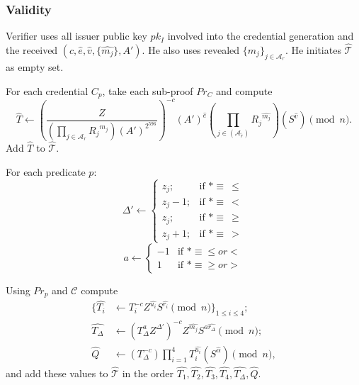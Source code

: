 \documentclass[a4paper]{article}
\begin{document}
\subsubsection{Validity}
Verifier uses all issuer public key $pk_I$ involved into the credential generation and  the received $(c,\widehat{e},\widehat{v},\{\widehat{m_j}\},A')$. He also uses revealed
$\{m_j\}_{j \in \mathcal{A}_r}$. He initiates $\widehat{\mathcal{T}}$ as empty set.


\begin{legal}
\item For each credential $C_p$, take each sub-proof $Pr_C$ and compute
\begin{equation}\label{eq:that}
 \widehat{T} \leftarrow \left(
    \frac{Z}
    { \left(
        \prod_{j \in \mathcal{A}_r}{R_j}^{m_j}
    \right)
    (A')^{2^{596}}
    }\right)^{-c}
    (A')^{\widehat{e}}
    \left(\prod_{j\in (\mathcal{A}_{\widetilde{r}})}{R_j}^{\widehat{m_j}}\right)
    (S^{\widehat{v}})\pmod{n}.
\end{equation}
Add $\widehat{T}$ to $\widehat{\mathcal{T}}$.
\item For each predicate $p$:
$$
\Delta' \leftarrow \begin{cases}
z_j; & \mbox{if } * \equiv\ \leq\\
z_j-1; & \mbox{if } * \equiv\ <\\
z_j; & \mbox{if } * \equiv\ \geq\\
z_j+1; & \mbox{if } * \equiv\ >
\end{cases}
$$
$$
a \leftarrow \begin{cases}
-1 & \mbox{if } * \equiv \leq or <\\
1  & \mbox{if } * \equiv \geq or >
\end{cases}
$$
\begin{legal}
\item Using $Pr_p$ and $\mathcal{C}$ compute
\begin{align}
\{\widehat{T_i} &\leftarrow T_i^{-c}Z^{\widehat{u_i}} S^{\widehat{r_i}}\pmod{n}\}_{1\leq i \leq 4};\label{eq:pr2}\\
\widehat{T_{\Delta}} &\leftarrow \left(T_{\Delta}^{a}Z^{\Delta'}\right)^{-c}Z^{\widehat{m_j}}S^{a\widehat{r_{\Delta}}}\pmod{n};\label{eq:pr1}\\
\widehat{Q}&\leftarrow (T_{\Delta}^{-c})\prod_{i=1}^{4}T_i^{\widehat{u_i}}(S^{\widehat{\alpha}})\pmod{n}\label{eq:pr3},
\end{align}
and add these values to  $\widehat{\mathcal{T}}$ in the order $\widehat{T_1},\widehat{T_2} ,\widehat{T_3},\widehat{T_4},\widehat{T_{\Delta}},\widehat{Q}$.
\end{legal}
\end{legal}
\end{document}
